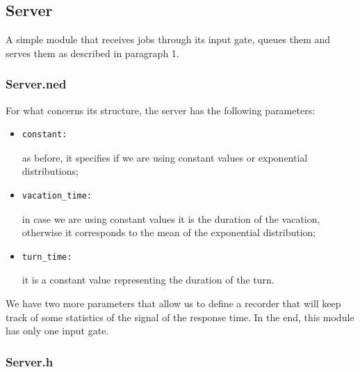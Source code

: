 \documentclass{article}
\begin{document}
    \subsection{Server}
    A simple module that receives jobs through its input gate, queues them and serves them as described in paragraph 1.
    
        \subsubsection{Server.ned}
        For what concerns its structure, the server has the following parameters:
         \begin{itemize}
            \item 
            \begin{verbatim}constant:\end{verbatim}
            as before, it specifies if we are using constant values or exponential distributions;
            \item
            \begin{verbatim}vacation_time:\end{verbatim}
            in case we are using constant values it is the duration of the vacation, otherwise it corresponds to the mean of the exponential distribution;
            \item
            \begin{verbatim}turn_time:\end{verbatim}
            it is a constant value representing the duration of the turn.
        \end{itemize}
        We have two more parameters that allow us to define a recorder that will keep track of some statistics of the signal of the response time.
        \newline
        In the end, this module has only one input gate.
        
        
        \newpage
        
        \subsubsection{Server.h}
        
        
        \newpage
        
\end{document}
